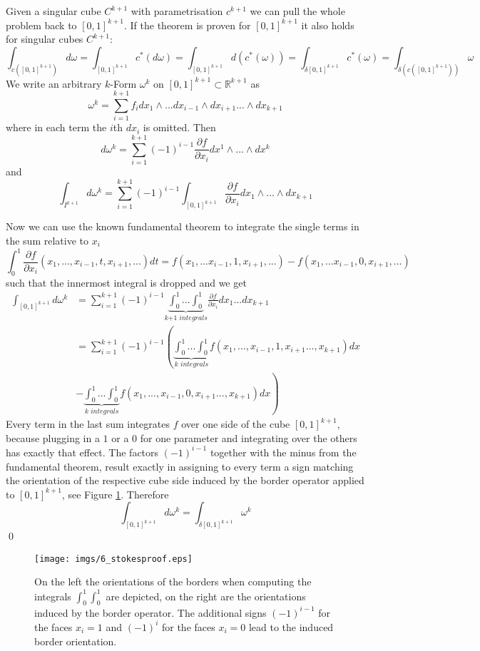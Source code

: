 Given a singular cube $C^{k+1}$ with parametrisation $c^{k+1}$ we can pull the whole problem back to $[0,1]^{k+1}$. If the theorem is proven for $[0,1]^{k+1}$ it also holds for singular cubes $C^{k+1}$:
\[\int_{c([0,1]^{k+1})}d \omega = \int_{[0,1]^{k+1}} c^*(d\omega) = \int_{[0,1]^{k+1}} d(c^*(\omega)) = \int_{\delta [0,1]^{k+1}} c^*(\omega) = \int_{\delta(c([0,1]^{k+1}))} \omega\] 
We write an arbitrary $k$-Form $\omega^k$ on $[0,1]^{k+1} \subset \mathbb R^{k+1}$ as 
\[\omega^k = \sum_{i=1}^{k+1} f_i dx_1 \wedge...dx_{i-1} \wedge dx_{i+1} ...\wedge dx_{k+1}\]
where in each term the $i$th $dx_i$ is omitted. Then
\[d\omega^k = \sum_{i=1}^{k+1}(-1)^{i-1}\frac{\partial f}{\partial x_i}dx^1\wedge ... \wedge dx^k\]
and
\[\int_{I^{k+1}} d \omega^k = \sum_{i=1}^{k+1}(-1)^{i-1} \int_{[0,1]^{k+1}} \frac{\partial f}{\partial x_i} dx_1 \wedge...\wedge dx_{k+1}\]


Now we can use the known fundamental theorem to integrate the single terms in the sum relative to $x_i$
\[\int_{0}^1 \frac{\partial f}{\partial x_i} (x_1,...,x_{i-1},t,x_{i+1},...) dt = f(x_1,...x_{i-1},1,x_{i+1},...) - f(x_1,...x_{i-1},0,x_{i+1},...)\]
such that the innermost integral is dropped and we get
\begin{align*}\int_{[0,1]^{k+1}} d \omega^k &= \sum_{i=1}^{k+1}(-1)^{i-1} \underbrace{\int_{0}^1...\int_{0}^1}_{\textit{k+1 integrals}} \frac{\partial f}{\partial x_i} dx_1...dx_{k+1}\\
&= \sum_{i=1}^{k+1}(-1)^{i-1} \left(\underbrace{\int_{0}^1...\int_{0}^1}_{\textit{k integrals}} f(x_1,...,x_{i-1},1,x_{i+1}...,x_{k+1}) dx \right.\\
&- \left. \underbrace{\int_{0}^1...\int_{0}^1}_{\textit{k integrals}} f(x_1,...,x_{i-1},0,x_{i+1}...,x_{k+1}) dx \right)\end{align*}
Every term in the last sum integrates $f$ over one side of the cube $[0,1]^{k+1}$, because plugging in a $1$ or a $0$ for one parameter and integrating over the others has exactly that effect. The factors $(-1)^{i-1}$ together with the minus from the fundamental theorem, result exactly in assigning to every term a sign matching the orientation of the respective cube side induced by the border operator applied to $[0,1]^{k+1}$, see Figure \ref{fig:6_stokesproof}. Therefore
\[\int_{[0,1]^{k+1}} d \omega^k = \int_{\delta [0,1]^{k+1}}\omega^k\]
\qed

\begin{figure}[t]%
\texttt{[image: imgs/6\_stokesproof.eps]}%
\caption{On the left the orientations of the borders when computing the integrals $\int_0^1\int_0^1$ are depicted, on the right are the orientations induced by the border operator. The additional signs $(-1)^{i-1}$ for the faces $x_i=1$ and $(-1)^{i}$ for the faces $x_i=0$ lead to the induced border orientation.}%
\label{fig:6_stokesproof}%
\end{figure}


